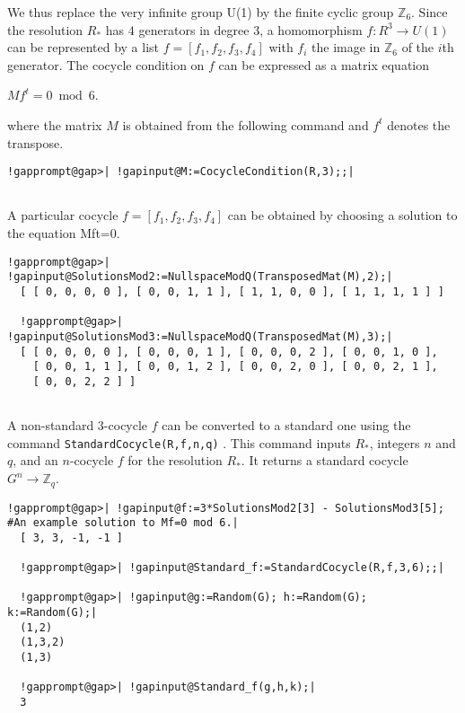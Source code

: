 \documentclass[a4paper,11pt]{report}
\begin{document}
{{\begin{Verbatim}[commandchars=@|A,fontsize=\small,frame=single,label=Example]
\end{Verbatim}
 

 We thus replace the very infinite group U(1) by the finite cyclic group $\mathbb Z_6$. Since the resolution $R_\ast $ has $4$ generators in degree $3$, a homomorphism $f\colon R^3\rightarrow U(1)$ can be represented by a list $f=[f_1, f_2, f_3, f_4]$ with $f_i$ the image in $\mathbb Z_6$ of the $i$th generator. The cocycle condition on $f$ can be expressed as a matrix equation 

$Mf^t = 0 \bmod 6$. 

 where the matrix $M$ is obtained from the following command and $f^t$ denotes the transpose. 
\begin{Verbatim}[commandchars=!@|,fontsize=\small,frame=single,label=Example]
  !gapprompt@gap>| !gapinput@M:=CocycleCondition(R,3);;|
  
\end{Verbatim}
 A particular cocycle $f=[f_1, f_2, f_3, f_4]$ can be obtained by choosing a solution to the equation
Mf\texttt{}t=0. 
\begin{Verbatim}[commandchars=!@|,fontsize=\small,frame=single,label=Example]
  !gapprompt@gap>| !gapinput@SolutionsMod2:=NullspaceModQ(TransposedMat(M),2);|
  [ [ 0, 0, 0, 0 ], [ 0, 0, 1, 1 ], [ 1, 1, 0, 0 ], [ 1, 1, 1, 1 ] ]
  
  !gapprompt@gap>| !gapinput@SolutionsMod3:=NullspaceModQ(TransposedMat(M),3);|
  [ [ 0, 0, 0, 0 ], [ 0, 0, 0, 1 ], [ 0, 0, 0, 2 ], [ 0, 0, 1, 0 ],
    [ 0, 0, 1, 1 ], [ 0, 0, 1, 2 ], [ 0, 0, 2, 0 ], [ 0, 0, 2, 1 ],
    [ 0, 0, 2, 2 ] ]
  
\end{Verbatim}
 A non-standard $3$-cocycle $f$ can be converted to a standard one using the command \texttt{StandardCocycle(R,f,n,q)} . This command inputs $ R_\ast$, integers $n$ and $q$, and an $n$-cocycle $f$ for the resolution $R_\ast$. It returns a standard cocycle $G^n \rightarrow \mathbb Z_q$. 
\begin{Verbatim}[commandchars=!@|,fontsize=\small,frame=single,label=Example]
  !gapprompt@gap>| !gapinput@f:=3*SolutionsMod2[3] - SolutionsMod3[5];   #An example solution to Mf=0 mod 6.|
  [ 3, 3, -1, -1 ]
  
  !gapprompt@gap>| !gapinput@Standard_f:=StandardCocycle(R,f,3,6);;|
  
  !gapprompt@gap>| !gapinput@g:=Random(G); h:=Random(G); k:=Random(G);|
  (1,2)
  (1,3,2)
  (1,3)
  
  !gapprompt@gap>| !gapinput@Standard_f(g,h,k);|
  3
  

\end{Verbatim}}}
\end{document}
